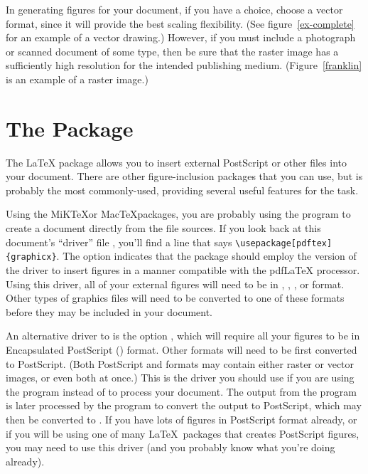 In generating figures for your document, if you have a choice, choose
a vector format, since it will provide the best scaling flexibility.
(See figure~\ref{ex-complete} for an example of a vector drawing.)
However, if you must include a photograph or scanned document of some
type, then be sure that the raster image has a sufficiently high
resolution for the intended publishing medium. (Figure~\ref{franklin}
is an example of a  raster image.)

\section{The  Package}
The \LaTeX{} package  allows you to insert external
PostScript or other files into your document.  There are other
figure-inclusion packages that you can use, but  is
probably the most commonly-used, providing several useful features for
the task.

Using the MiK\TeX or Mac\TeX packages, you are probably using the
 program to create a  document directly from
the file sources.  If you look back at this document's ``driver'' file
, you'll find a line that says
\verb|\usepackage[pdftex]{graphicx}|.  The option 
indicates that the  package should employ the
 version of the driver to insert figures in a manner
compatible with the pdf\LaTeX{} processor.  Using this driver, all of
your external figures will need to be in , ,
, or  format.  Other types of graphics files will
need to be converted to one of these formats before they may be
included in your document.

An alternative driver to  is the option , which
will require all your figures to be in Encapsulated PostScript
() format.  Other formats will need to be first converted to
PostScript.  (Both PostScript and  formats may contain
either raster or vector images, or even both at once.)  This is the
driver you should use if you are using the program  instead
of  to process your document.  The  output
from the  program is later processed by the 
program to convert the output to PostScript, which may then be
converted to .  If you have lots of figures in PostScript
format already, or if you will be using one of many \LaTeX\ packages
that creates PostScript figures, you may need to use this driver (and
you probably know what you're doing already).

